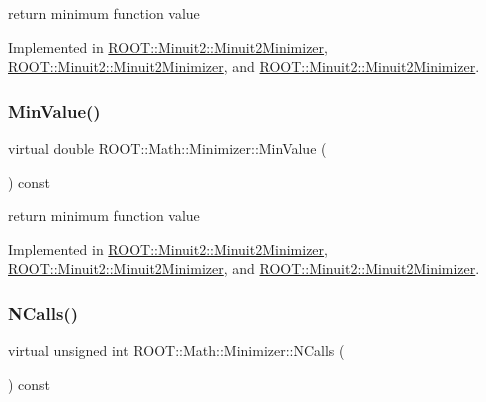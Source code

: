 return minimum function value 



Implemented in \mbox{\hyperlink{classROOT_1_1Minuit2_1_1Minuit2Minimizer_a4a1c7fc174527aefab3d8c87bf8c0672}{R\+O\+O\+T\+::\+Minuit2\+::\+Minuit2\+Minimizer}}, \mbox{\hyperlink{classROOT_1_1Minuit2_1_1Minuit2Minimizer_a4a1c7fc174527aefab3d8c87bf8c0672}{R\+O\+O\+T\+::\+Minuit2\+::\+Minuit2\+Minimizer}}, and \mbox{\hyperlink{classROOT_1_1Minuit2_1_1Minuit2Minimizer_a4a1c7fc174527aefab3d8c87bf8c0672}{R\+O\+O\+T\+::\+Minuit2\+::\+Minuit2\+Minimizer}}.

\mbox{\label{classROOT_1_1Math_1_1Minimizer_ae4845ff42bc0e244fdfa068c53b9a965}} 
\subsubsection{\texorpdfstring{MinValue()}{MinValue()}\hspace{0.1cm}{\footnotesize\ttfamily [3/3]}}
{\footnotesize\ttfamily virtual double R\+O\+O\+T\+::\+Math\+::\+Minimizer\+::\+Min\+Value (\begin{DoxyParamCaption}{ }\end{DoxyParamCaption}) const\hspace{0.3cm}{\ttfamily [pure virtual]}}



return minimum function value 



Implemented in \mbox{\hyperlink{classROOT_1_1Minuit2_1_1Minuit2Minimizer_a4a1c7fc174527aefab3d8c87bf8c0672}{R\+O\+O\+T\+::\+Minuit2\+::\+Minuit2\+Minimizer}}, \mbox{\hyperlink{classROOT_1_1Minuit2_1_1Minuit2Minimizer_a4a1c7fc174527aefab3d8c87bf8c0672}{R\+O\+O\+T\+::\+Minuit2\+::\+Minuit2\+Minimizer}}, and \mbox{\hyperlink{classROOT_1_1Minuit2_1_1Minuit2Minimizer_a4a1c7fc174527aefab3d8c87bf8c0672}{R\+O\+O\+T\+::\+Minuit2\+::\+Minuit2\+Minimizer}}.

\mbox{\label{classROOT_1_1Math_1_1Minimizer_abf8b2e97d47843a1fde7a54cb51c1f0e}} 
\subsubsection{\texorpdfstring{NCalls()}{NCalls()}\hspace{0.1cm}{\footnotesize\ttfamily [1/3]}}
{\footnotesize\ttfamily virtual unsigned int R\+O\+O\+T\+::\+Math\+::\+Minimizer\+::\+N\+Calls (\begin{DoxyParamCaption}{ }\end{DoxyParamCaption}) const\hspace{0.3cm}{\ttfamily [pure virtual]}}



